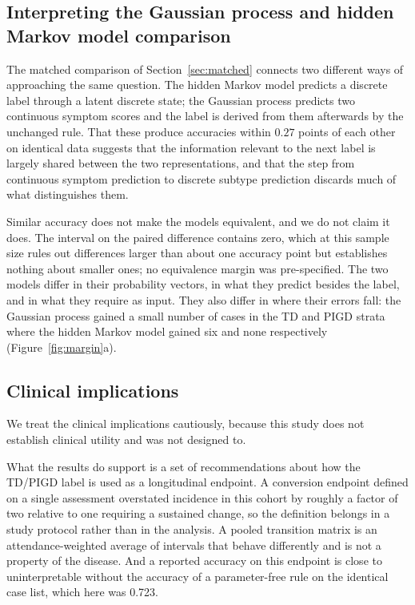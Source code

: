 \documentclass[11pt]{article}
\begin{document}
\subsection{Interpreting the Gaussian process and hidden Markov model comparison}
\label{sec:interp-matched}
The matched comparison of Section~\ref{sec:matched} connects two different ways
of approaching the same question. The hidden Markov model predicts a discrete
label through a latent discrete state; the Gaussian process predicts two
continuous symptom scores and the label is derived from them afterwards by the
unchanged rule. That these produce accuracies within $0.27$ points of each other
on identical data suggests that the information relevant to the next label is
largely shared between the two representations, and that the step from
continuous symptom prediction to discrete subtype prediction discards much of
what distinguishes them.

Similar accuracy does not make the models equivalent, and we do not claim it
does. The interval on the paired difference contains zero, which at this sample
size rules out differences larger than about one accuracy point but establishes
nothing about smaller ones; no equivalence margin was pre-specified. The two
models differ in their probability vectors, in what they predict besides the
label, and in what they require as input. They also differ in where their errors
fall: the Gaussian process gained a small number of cases in the TD and PIGD
strata where the hidden Markov model gained six and none respectively
(Figure~\ref{fig:margin}a).

\subsection{Clinical implications}
We treat the clinical implications cautiously, because this study does not
establish clinical utility and was not designed to.

What the results do support is a set of recommendations about how the TD/PIGD
label is used as a longitudinal endpoint. A conversion endpoint defined on a
single assessment overstated incidence in this cohort by roughly a factor of two
relative to one requiring a sustained change, so the definition belongs in a
study protocol rather than in the analysis. A pooled transition matrix is an
attendance-weighted average of intervals that behave differently and is not a
property of the disease. And a reported accuracy on this endpoint is close to
uninterpretable without the accuracy of a parameter-free rule on the identical
case list, which here was 0.723.
\end{document}

